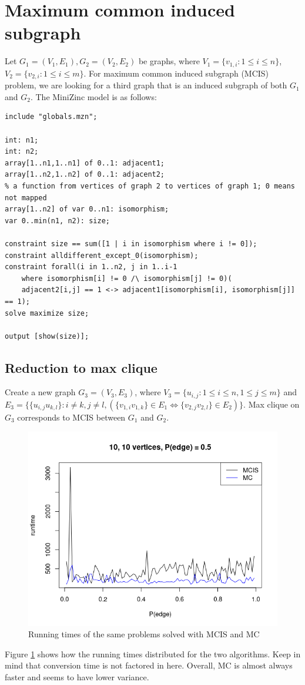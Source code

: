 \documentclass{article}
\theoremstyle{definition}
\begin{document}
\section{Maximum common induced subgraph}
Let $G_1 = (V_1, E_1), G_2 = (V_2, E_2) $ be graphs, where $ V_1 = \{v_{1,i}: 1 \le i \le n\}$, $ V_2 = \{v_{2,i}: 1 \le i \le m\}$. For maximum common induced subgraph (MCIS) problem, we are looking for a third graph that is an induced subgraph of both $G_1$ and $G_2$. The MiniZinc model is as follows:
\begin{lstlisting}
include "globals.mzn";

int: n1;
int: n2;
array[1..n1,1..n1] of 0..1: adjacent1;
array[1..n2,1..n2] of 0..1: adjacent2;
% a function from vertices of graph 2 to vertices of graph 1; 0 means not mapped
array[1..n2] of var 0..n1: isomorphism;
var 0..min(n1, n2): size;

constraint size == sum([1 | i in isomorphism where i != 0]);
constraint alldifferent_except_0(isomorphism);
constraint forall(i in 1..n2, j in 1..i-1
    where isomorphism[i] != 0 /\ isomorphism[j] != 0)(
    adjacent2[i,j] == 1 <-> adjacent1[isomorphism[i], isomorphism[j]] == 1);
solve maximize size;

output [show(size)];
\end{lstlisting}
\subsection{Reduction to max clique}
Create a new graph $G_3 = (V_3, E_3)$, where $V_3 = \{u_{i,j}: 1 \le i \le n, 1 \le j \le m\}$ and $E_3 = \{\{u_{i,j}u_{k,l}\}: i \ne k, j \ne l, (\{v_{1,i}v_{1,k}\} \in E_1 \iff \{v_{2,j}v_{2,l}\} \in E_2)\}$. Max clique on $G_3$ corresponds to MCIS between $G_1$ and $G_2$. 
\begin{figure}
  \includegraphics[scale=0.5]{conversion.png}
  \caption{Running times of the same problems solved with MCIS and MC}
  \label{fig:conversion}
\end{figure}
Figure \ref{fig:conversion} shows how the running times distributed for the two algorithms. Keep in mind that conversion time is not factored in here. Overall, MC is almost always faster and seems to have lower variance.
\end{document}
